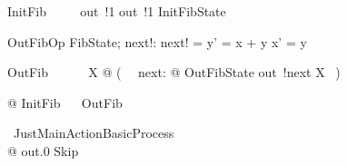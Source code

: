 \documentclass{article}
\begin{document}
\begin{circusaction}
    InitFib ~~\circdef~~ out~!1 \then out~!1 \then InitFibState
\end{circusaction}

\begin{schema}{OutFibOp}
    \Delta FibState; next!: \nat
\where
    next! = y' = x + y \land x' = y
\end{schema}

\begin{circusaction}
    OutFib ~~\circdef~~ \circmu\ X @ (~ \circvar\ next: \nat @ OutFibState \circseq out~!next \then X ~)
\end{circusaction}

\begin{circusaction}
    @ InitFib ~\circseq~ OutFib \\
    \circend
\end{circusaction}

\begin{circus}
    \circprocess\ JustMainActionBasicProcess ~~\circdef~~ \circbegin \\
    @ out.0 \then Skip \\
    \circend
\end{circus}
\end{document}
